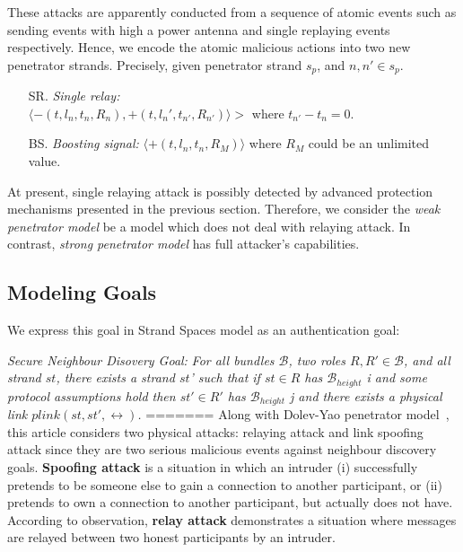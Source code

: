 \begin{flushleft}
\begin{flushleft}
\begin{Definition}
\begin{itemize}
These attacks are apparently conducted from a sequence of atomic events such as sending events with high a power antenna  and single replaying events respectively. Hence, we encode the atomic malicious actions into two new penetrator strands. Precisely, given penetrator strand $s_p$, and $n, n' \in s_p$. 
\begin{itemize}
\item[SR.] \emph{Single relay:} \\ $\langle -(t, l_n, t_n, R_n), +(t, l_n', t_{n'}, R_{n'}) \rangle >$ where $t_{n'} - t_n = 0$.
\item [BS.] \emph{Boosting signal:} $\langle +(t, l_n, t_n, R_M) \rangle$ where $R_M$ could be an unlimited value. 
\end{itemize}

At present, single relaying attack is possibly detected by advanced protection mechanisms presented in the previous section. Therefore, we consider the \emph{weak penetrator model} be a model which does not deal with relaying attack. In contrast, \emph{strong penetrator model} has full attacker's capabilities. 

\subsection{Modeling Goals}

We express this goal in Strand Spaces model as an authentication goal:

\emph{Secure Neighbour Disovery Goal:} \textit{For all bundles $\mathcal{B}$, two roles $R, R' \in \mathcal{B}$, and all strand $st$, there exists a strand $st$' such that if $st \in R$ has $ \mathcal{B}_{height}$ i and some protocol assumptions hold then $st' \in R'$ has $\mathcal{B}_{height}$ j and there exists a physical link $plink(st,st',\leftrightarrow)$.}
=======
Along with Dolev-Yao penetrator model~\cite{dolev-yao}, this article considers two physical attacks: relaying attack and link spoofing attack since they are two serious malicious events against neighbour discovery goals. \textbf{Spoofing attack} is a situation in which an intruder (i) successfully pretends to be someone else to gain a connection to another participant, or (ii) pretends to own a connection to another participant, but actually does not have. According to observation, \textbf{relay attack} demonstrates a situation where messages are relayed between two honest participants by an intruder. 


\end{itemize}
\end{Definition}
\end{flushleft}
\end{flushleft}
